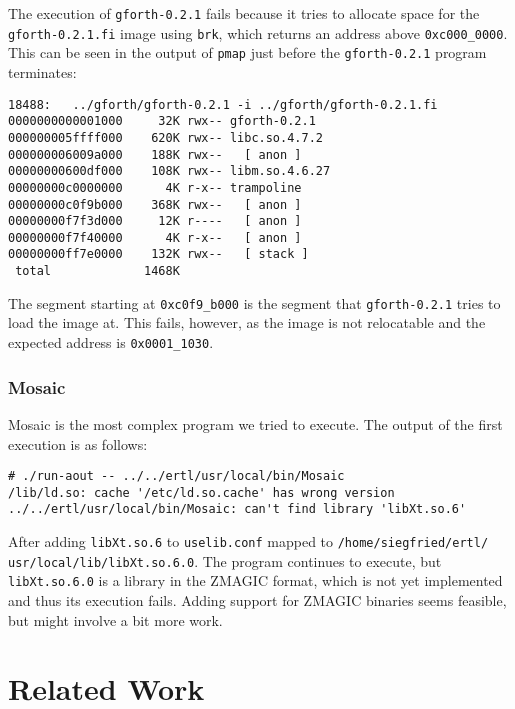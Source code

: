 \documentclass[draft,final]{vutinfth} %
\begin{document}
The execution of \texttt{gforth-0.2.1} fails because it tries to allocate space for the \texttt{gforth-0.2.1.fi} image using \texttt{brk}, which returns an address above \texttt{0xc000\_0000}. This can be seen in the output of \texttt{pmap} just before the \texttt{gforth-0.2.1} program terminates:

\begin{lstlisting}[caption={Pmap for \texttt{gforth 0.2.1}}]
18488:   ../gforth/gforth-0.2.1 -i ../gforth/gforth-0.2.1.fi
0000000000001000     32K rwx-- gforth-0.2.1
000000005ffff000    620K rwx-- libc.so.4.7.2
000000006009a000    188K rwx--   [ anon ]
00000000600df000    108K rwx-- libm.so.4.6.27
00000000c0000000      4K r-x-- trampoline
00000000c0f9b000    368K rwx--   [ anon ]
00000000f7f3d000     12K r----   [ anon ]
00000000f7f40000      4K r-x--   [ anon ]
00000000ff7e0000    132K rwx--   [ stack ]
 total             1468K
\end{lstlisting}

The segment starting at \texttt{0xc0f9\_b000} is the segment that \texttt{gforth-0.2.1} tries to load the image at. This fails, however, as the image is not relocatable and the expected address is \texttt{0x0001\_1030}.

\subsection{Mosaic}

Mosaic is the most complex program we tried to execute. The output of the first execution is as follows:

\begin{lstlisting}[caption={Output of the first execution of Mosaic}]
# ./run-aout -- ../../ertl/usr/local/bin/Mosaic 
/lib/ld.so: cache '/etc/ld.so.cache' has wrong version
../../ertl/usr/local/bin/Mosaic: can't find library 'libXt.so.6'
\end{lstlisting}

After adding \texttt{libXt.so.6} to \texttt{uselib.conf} mapped to \texttt{/home/siegfried/ertl/ usr/local/lib/libXt.so.6.0}. The program continues to execute, but \texttt{libXt.so.6.0} is a library in the ZMAGIC format, which is not yet implemented and thus its execution fails. Adding support for ZMAGIC binaries seems feasible, but might involve a bit more work.

\chapter{Related Work}
\end{document}
